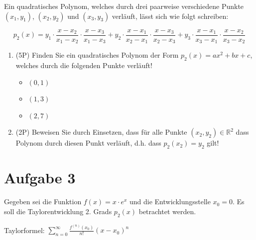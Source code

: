 \documentclass[12pt]{article}
\begin{document}
Ein quadratisches Polynom, welches durch drei paarweise verschiedene Punkte $(x_1,y_1)$, $(x_2,y_2)$ und $(x_3,y_3)$ verläuft, lässt sich wie folgt schreiben:

$$
p_2(x) =
y_1\cdot\frac{x-x_2}{x_1-x_2}\cdot\frac{x-x_3}{x_1-x_3} +
y_2\cdot\frac{x-x_1}{x_2-x_1}\cdot \frac{x-x_3}{x_2-x_3} +
y_3\cdot\frac{x-x_1}{x_3-x_1}\cdot\frac{x-x_2}{x_3-x_2}
$$


\begin{enumerate}[label=(\alph*)]

\item (5P) Finden Sie ein quadratisches Polynom der Form $p_2(x)=ax^2+bx+c$, welches durch die folgenden Punkte verläuft!

\begin{itemize}
\item $(0,1)$
\item $(1,3)$
\item $(2,7)$
\end{itemize}

\bigskip
\bigskip
\bigskip
\bigskip
\bigskip
\bigskip
\bigskip
\bigskip
\bigskip
\bigskip
\bigskip
\bigskip

\item (2P) Beweisen Sie durch Einsetzen, dass für alle Punkte $(x_2,y_2)\in\mathbb{R}^2$ dass Polynom durch diesen Punkt verläuft, d.h. dass $p_2(x_2) = y_2$ gilt!

\end{enumerate}

\newpage
\section* {Aufgabe 3}

Gegeben sei die Funktion $f(x) = x\cdot e^x$ und die Entwicklungsstelle $x_0=0$. Es soll die Taylorentwicklung 2. Grads $p_2(x)$ betrachtet werden.

Taylorformel: $\sum\limits_{n=0}^\infty\frac{f^{(n)}(x_0)}{n!}(x-x_0)^n$
\end{document}
